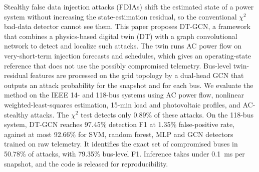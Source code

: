 Stealthy false data injection attacks (FDIAs) shift the estimated state of a power system without increasing the state-estimation residual, so the conventional $\chi^2$ bad-data detector cannot see them. This paper proposes DT-GCN, a framework that combines a physics-based digital twin (DT) with a graph convolutional network to detect and localize such attacks. The twin runs AC power flow on very-short-term injection forecasts and schedules, which gives an operating-state reference that does not use the possibly compromised telemetry. Bus-level twin-residual features are processed on the grid topology by a dual-head GCN that outputs an attack probability for the snapshot and for each bus. We evaluate the method on the IEEE 14- and 118-bus systems using AC power flow, nonlinear weighted-least-squares estimation, 15-min load and photovoltaic profiles, and AC-stealthy attacks. The $\chi^2$ test detects only 0.89\% of these attacks. On the 118-bus system, DT-GCN reaches 97.45\% detection F1 at 1.35\% false-positive rate, against at most 92.66\% for SVM, random forest, MLP and GCN detectors trained on raw telemetry. It identifies the exact set of compromised buses in 50.78\% of attacks, with 79.35\% bus-level F1. Inference takes under 0.1~ms per snapshot, and the code is released for reproducibility.
